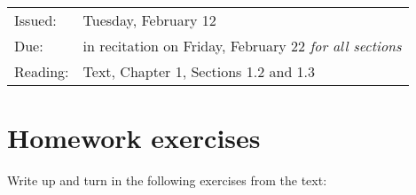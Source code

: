 % 
% 
% 
% 
% 
% 




\evensidemargin 35pt




\medskip

\begin{tabular}{ll}
Issued: & Tuesday, February 12 \\
Due: & in recitation on Friday, February 22 {\em for all sections} \\
Reading: & Text, Chapter 1, Sections 1.2 and 1.3 
\end{tabular}

\section{Homework exercises}

Write up and turn in the following exercises from the text:

